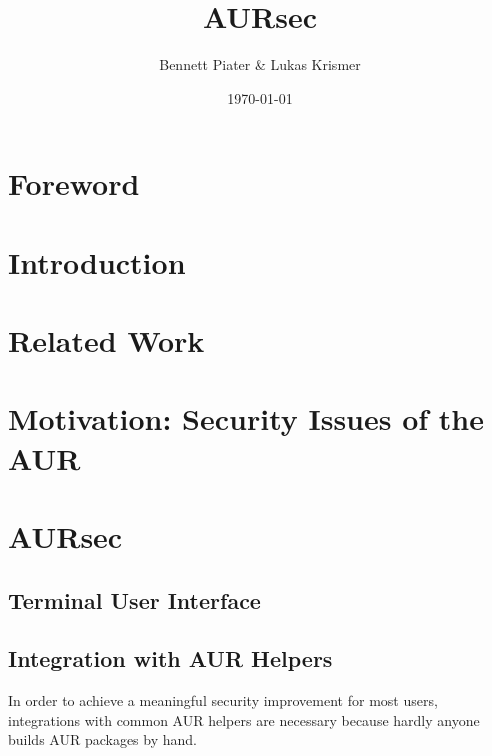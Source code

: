 \documentclass[11pt]{scrartcl}
\title{AURsec}
\author{Bennett Piater \& Lukas Krismer}
\date{\today}
\begin{document}
  \thispagestyle{empty}

  



  \begin{abstract}
    
  \end{abstract}

  \section*{Foreword}
  
  \pagebreak


  \tableofcontents
  \listoffigures
  \pagebreak



  \section{Introduction}  %
    

  \section{Related Work}
    
    

  \section{Motivation: Security Issues of the AUR} %
    \label{sec:security_issues}

  \section{AURsec}
    \subsection{Terminal User Interface} %
    
    \subsection{Integration with AUR Helpers} \label{sec:integration}
    In order to achieve a meaningful security improvement for most users, integrations with common AUR helpers are necessary because hardly anyone builds AUR packages by hand.
\end{document}
